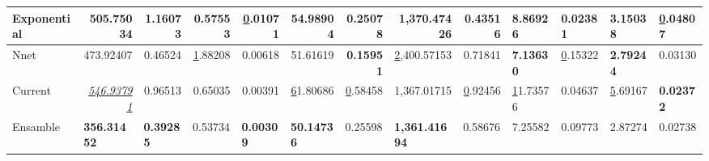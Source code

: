 \begin{table}[]
\begin{tabular}{@{}lrrrrrrrrllll@{}}
\multicolumn{1}{|l|}{Exponential}            & \multicolumn{1}{r|}{505.75034}                & \multicolumn{1}{r|}{1.16073}         & \multicolumn{1}{r|}{0.57553}          & \multicolumn{1}{r|}{{\ul 0.01071}}   & \multicolumn{1}{r|}{54.98904}         & \multicolumn{1}{r|}{0.25078}          & \multicolumn{1}{r|}{1,370.47426}         & \multicolumn{1}{r|}{\textbf{0.43516}} & \multicolumn{1}{l|}{8.86926}          & \multicolumn{1}{l|}{\textbf{0.02381}} & \multicolumn{1}{l|}{3.15038}          & \multicolumn{1}{l|}{{\ul 0.04807}}    \\ \midrule
\multicolumn{1}{|l|}{Nnet}                   & \multicolumn{1}{r|}{473.92407}                & \multicolumn{1}{r|}{0.46524}         & \multicolumn{1}{r|}{{\ul 1.88208}}    & \multicolumn{1}{r|}{0.00618}         & \multicolumn{1}{r|}{51.61619}         & \multicolumn{1}{r|}{\textbf{0.15951}} & \multicolumn{1}{r|}{{\ul 2,400.57153}}   & \multicolumn{1}{r|}{0.71841}          & \multicolumn{1}{l|}{\textbf{7.13630}} & \multicolumn{1}{l|}{{\ul 0.15322}}    & \multicolumn{1}{l|}{\textbf{2.79244}} & \multicolumn{1}{l|}{0.03130}          \\ \midrule
\multicolumn{1}{|l|}{Current}                & \multicolumn{1}{r|}{{\ul \textit{546.93791}}} & \multicolumn{1}{r|}{0.96513}         & \multicolumn{1}{r|}{0.65035}          & \multicolumn{1}{r|}{0.00391}         & \multicolumn{1}{r|}{{\ul 61.80686}}   & \multicolumn{1}{r|}{{\ul 0.58458}}    & \multicolumn{1}{r|}{1,367.01715}         & \multicolumn{1}{r|}{{\ul 0.92456}}    & \multicolumn{1}{l|}{{\ul 11.73576}}   & \multicolumn{1}{l|}{0.04637}          & \multicolumn{1}{l|}{{\ul 5.69167}}    & \multicolumn{1}{l|}{\textbf{0.02372}} \\ \midrule
Ensamble                                     & \multicolumn{1}{l}{\textbf{356.31452}}        & \multicolumn{1}{l}{\textbf{0.39285}} & \multicolumn{1}{l}{0.53734}           & \multicolumn{1}{l}{\textbf{0.00309}} & \multicolumn{1}{l}{\textbf{50.14736}} & \multicolumn{1}{l}{0.25598}           & \multicolumn{1}{l}{\textbf{1,361.41694}} & \multicolumn{1}{l}{0.58676}           & 7.25582                               & 0.09773                               & 2.87274                               & 0.02738                               \\ \bottomrule
\end{tabular}
\end{table}